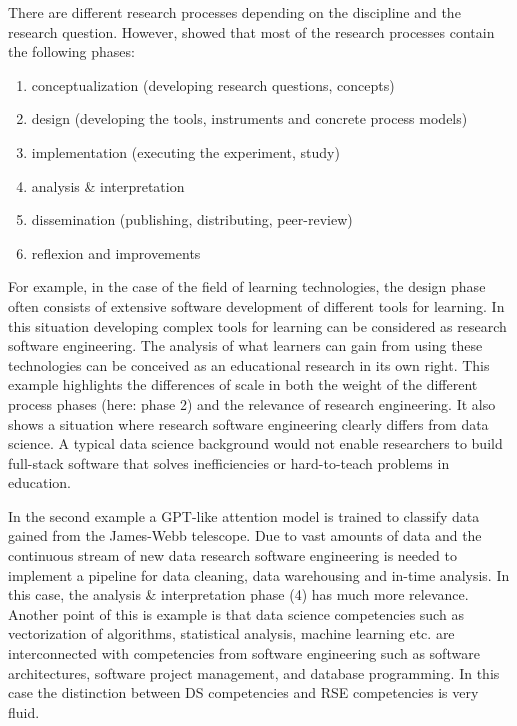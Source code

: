 \documentclass[
        english,biblatex
    ]{lni}
\providecommand{\tightlist}{%
    \setlength{\itemsep}{0pt}\setlength{\parskip}{0pt}}
\begin{document}
    There are different research processes depending on the discipline
    and the research question. However, \autocite{Dehne2021} showed that
    most of the research processes contain the following phases:

    \begin{enumerate}
    \def\labelenumi{\arabic{enumi}.}
    \tightlist
    \item
      conceptualization (developing research questions, concepts)
    \item
      design (developing the tools, instruments and concrete process
      models)
    \item
      implementation (executing the experiment, study)
    \item
      analysis \& interpretation
    \item
      dissemination (publishing, distributing, peer-review)
    \item
      reflexion and improvements
    \end{enumerate}

    For example, in the case of the field of learning technologies, the
    design phase often consists of extensive software development of
    different tools for learning. In this situation developing complex
    tools for learning can be considered as research software
    engineering. The analysis of what learners can gain from using these
    technologies can be conceived as an educational research in its own
    right. This example highlights the differences of scale in both the
    weight of the different process phases (here: phase 2) and the
    relevance of research engineering. It also shows a situation where
    research software engineering clearly differs from data science. A
    typical data science background would not enable researchers to
    build full-stack software that solves inefficiencies or
    hard-to-teach problems in education.

    In the second example a GPT-like attention model is trained to
    classify data gained from the James-Webb telescope. Due to vast
    amounts of data and the continuous stream of new data research
    software engineering is needed to implement a pipeline for data
    cleaning, data warehousing and in-time analysis. In this case, the
    analysis \& interpretation phase (4) has much more relevance.
    Another point of this is example is that data science competencies
    such as vectorization of algorithms, statistical analysis, machine
    learning etc. are interconnected with competencies from software
    engineering such as software architectures, software project
    management, and database programming. In this case the distinction
    between DS competencies and RSE competencies is very fluid.
\end{document}
